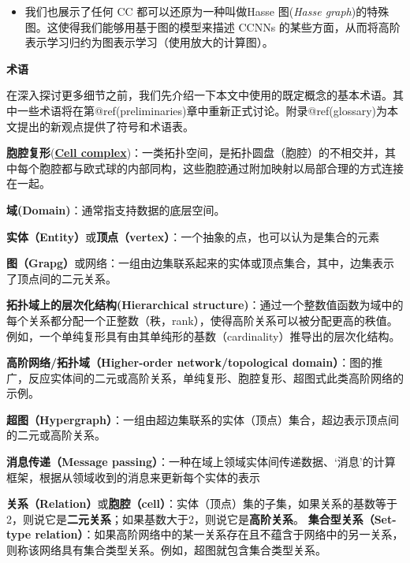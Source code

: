 \documentclass[
  12pt,
]{krantz}
\providecommand{\tightlist}{%
  \setlength{\itemsep}{0pt}\setlength{\parskip}{0pt}}
\begin{document}
\begin{itemize}
\begin{itemize}
    \begin{itemize}
    \tightlist
    \item
      我们也展示了任何 CC 都可以还原为一种叫做Hasse 图(\emph{Hasse
      graph})的特殊图。这使得我们能够用基于图的模型来描述 CCNNs
      的某些方面，从而将高阶表示学习归约为图表示学习（使用放大的计算图）。
    \end{itemize}
  \end{itemize}
\end{itemize}

\textbf{术语}

在深入探讨更多细节之前，我们先介绍一下本文中使用的既定概念的基本术语。其中一些术语将在第@ref(preliminaries)章中重新正式讨论。附录@ref(glossary)为本文提出的新观点提供了符号和术语表。

\begin{glossarybox}
\textbf{胞腔复形}(\href{https://app.vectary.com/p/3EBiRiJcYjFNvkbbWszQ0Z}{\textbf{Cell
complex}})：一类拓扑空间，是拓扑圆盘（胞腔）的不相交并，其中每个胞腔都与欧式球的内部同构，这些胞腔通过附加映射以局部合理的方式连接在一起。

\textbf{域(Domain)}：通常指支持数据的底层空间。

\textbf{实体（Entity）}或\textbf{顶点（vertex）}：一个抽象的点，也可以认为是集合的元素

\textbf{图（Grapg）}或网络：一组由边集联系起来的实体或顶点集合，其中，边集表示了顶点间的二元关系。

\textbf{拓扑域上的层次化结构(Hierarchical
structure)}：通过一个整数值函数为域中的每个关系都分配一个正整数（秩，rank），使得高阶关系可以被分配更高的秩值。例如，一个单纯复形具有由其单纯形的基数（cardinality）推导出的层次化结构。

\textbf{高阶网络/拓扑域（Higher-order network/topological
domain）}：图的推广，反应实体间的二元或高阶关系，单纯复形、胞腔复形、超图式此类高阶网络的示例。

\textbf{超图（Hypergraph）}：一组由超边集联系的实体（顶点）集合，超边表示顶点间的二元或高阶关系。

\textbf{消息传递（Message
passing）}：一种在域上领域实体间传递数据、`消息'的计算框架，根据从领域收到的消息来更新每个实体的表示

\textbf{关系（Relation）}或\textbf{胞腔（cell）}：实体（顶点）集的子集，如果关系的基数等于2，则说它是\textbf{二元关系}；如果基数大于2，则说它是\textbf{高阶关系}。
\textbf{集合型关系（Set-type
relation）}：如果高阶网络中的某一关系存在且不蕴含于网络中的另一关系，则称该网络具有集合类型关系。例如，超图就包含集合类型关系。


\end{glossarybox}
\end{document}
